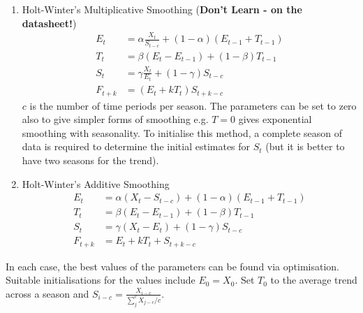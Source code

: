 \documentclass[a4paper]{article}
\begin{document}
\begin{enumerate}
\begin{enumerate}
	\item Holt-Winter's Multiplicative Smoothing (\textbf{Don't Learn - on the datasheet!})
	\begin{align*}
		E_t &= \alpha \frac{X_t}{S_{t-c}} + (1-\alpha)(E_{t-1} + T_{t-1}) \\
		T_{t} &= \beta(E_{t} - E_{t-1}) + (1-\beta)T_{t-1} \\ 
		S_t &= \gamma \frac{X_t}{E_{t}} + (1-\gamma)S_{t-c} \\
		F_{t+k} &= (E_t + kT_t)S_{t+k-c}
	\end{align*}
	 $c$ is the number of time periods per season. The parameters can be set to zero also to give simpler forms of smoothing e.g. $T=0$ gives exponential smoothing with seasonality. To initialise this method, a complete season of data is required to determine the initial estimates for $S_t$ (but it is better to have two seasons for the trend).
	 
	 \item Holt-Winter's Additive Smoothing
	 \begin{align*}
	 E_t &= \alpha (X_t - S_{t-c}) + (1-\alpha)(E_{t-1} + T_{t-1}) \\
	 T_{t} &= \beta(E_{t} - E_{t-1}) + (1-\beta)T_{t-1} \\ 
	 S_t &= \gamma (X_t - E_t) + (1-\gamma)S_{t-c} \\
	 F_{t+k} &= E_t + kT_t + S_{t+k-c}
	 \end{align*}
\end{enumerate}
In each case, the best values of the parameters can be found via optimisation. Suitable initialisations for the values include $E_0 = X_0$. Set $T_0$ to the average trend across a season and $S_{i-c} = \frac{X_{i-c}}{\sum_j^c X_{j-c}/c}$.


\end{enumerate}
\end{document}
